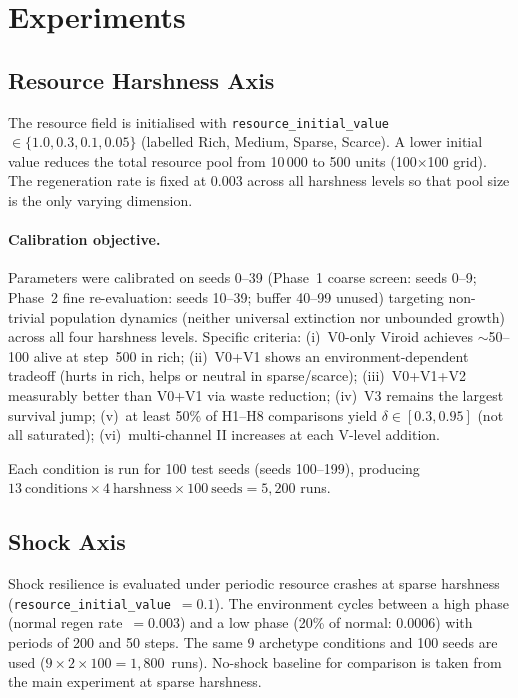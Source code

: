 \documentclass[letterpaper]{article}
\begin{document}
\section{Experiments}
\label{sec:experiments}

\subsection{Resource Harshness Axis}

The resource field is initialised with \texttt{resource\_initial\_value}
$\in \{1.0, 0.3, 0.1, 0.05\}$ (labelled Rich, Medium, Sparse, Scarce).
A lower initial value reduces the total resource pool from 10\,000 to 500 units
(100$\times$100 grid).
The regeneration rate is fixed at 0.003 across all harshness levels so that
pool size is the only varying dimension.

\paragraph{Calibration objective.}
Parameters were calibrated on seeds 0--39 (Phase~1 coarse screen: seeds 0--9;
Phase~2 fine re-evaluation: seeds 10--39; buffer 40--99 unused) targeting
non-trivial population dynamics (neither universal extinction nor unbounded
growth) across all four harshness levels.
Specific criteria: (i)~V0-only Viroid achieves $\sim$50--100 alive at step~500
in rich; (ii)~V0+V1 shows an environment-dependent tradeoff (hurts in rich,
helps or neutral in sparse/scarce); (iii)~V0+V1+V2 measurably better than
V0+V1 via waste reduction; (iv)~V3 remains the largest survival jump;
(v)~at least 50\% of H1--H8 comparisons yield $\delta \in [0.3, 0.95]$
(not all saturated); (vi)~multi-channel II increases at each V-level addition.

Each condition is run for 100 test seeds (seeds 100--199), producing
$13\ \text{conditions} \times 4\ \text{harshness} \times 100\ \text{seeds}
= 5{,}200$ runs.

\subsection{Shock Axis}

Shock resilience is evaluated under periodic resource crashes at sparse
harshness (\texttt{resource\_initial\_value}~$=0.1$).
The environment cycles between a high phase (normal regen rate~$=0.003$) and
a low phase (20\% of normal: $0.0006$) with periods of 200 and 50 steps.
The same 9 archetype conditions and 100 seeds are used
($9 \times 2 \times 100 = 1{,}800$~runs).
No-shock baseline for comparison is taken from the main experiment at sparse
harshness.
\end{document}
